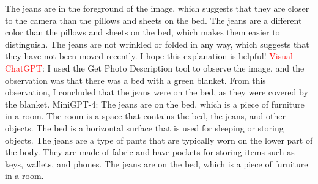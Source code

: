 \begin{enumerate}
    The jeans are in the foreground of the image, which suggests that they are closer to the camera than the pillows and sheets on the bed.
    The jeans are a different color than the pillows and sheets on the bed, which makes them easier to distinguish.
    The jeans are not wrinkled or folded in any way, which suggests that they have not been moved recently.
    I hope this explanation is helpful!
    \subitem \textcolor{red}{Visual ChatGPT}: I used the Get Photo Description tool to observe the image, and the observation was that there was a bed with a green blanket. From this observation, I concluded that the jeans were on the bed, as they were covered by the blanket.
    \subitem MiniGPT-4: The jeans are on the bed, which is a piece of furniture in a room. The room is a space that contains the bed, the jeans, and other objects. The bed is a horizontal surface that is used for sleeping or storing objects. The jeans are a type of pants that are typically worn on the lower part of the body. They are made of fabric and have pockets for storing items such as keys, wallets, and phones. The jeans are on the bed, which is a piece of furniture in a room.
\end{enumerate}
